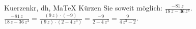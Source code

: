 \begin{MAufgabe}{Kuerzen}{kr, dh, MaTeX}
K\"urzen Sie soweit m\"oglich: $\frac{- 81\, z}{18\, z - 36\, z^4}$.\\ 
\ifLsg\MLoesung
\quad $\frac{- 81\, z}{18\, z - 36\, z^4}=\frac{(9\, z)\cdot(-9)}{(9\, z)\cdot(2 - 4\, z^3)}=\frac{-9}{2 - 4\, z^3}=\frac{9}{4\, z^3 - 2}$.\else\relax\fi
 \end{MAufgabe}